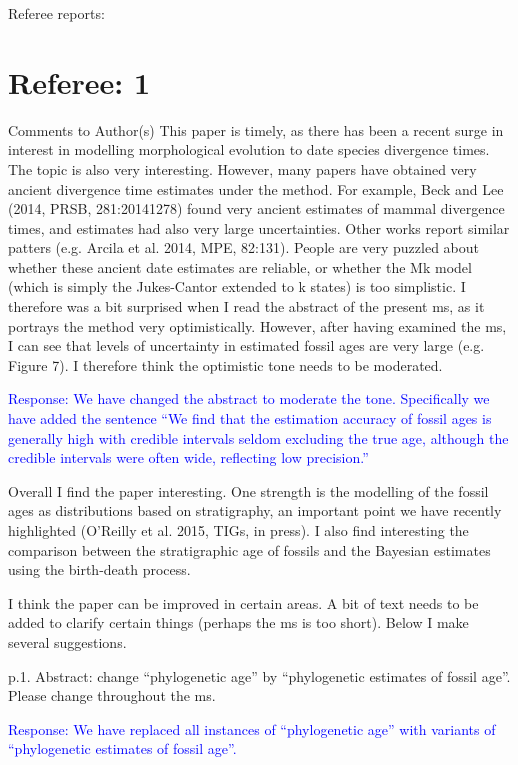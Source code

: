 \documentclass[11pt]{article}
\newcommand{\response}[1]{\medskip{}\textcolor{blue}{{Response: #1}}\medskip{}}
\begin{document}
Referee reports:

\section*{Referee: 1}

Comments to Author(s)
This paper is timely, as there has been a recent surge in interest in modelling morphological evolution to date species divergence times. The topic is also very interesting. However, many papers have obtained very ancient divergence time estimates under the method. For example, Beck and Lee (2014, PRSB, 281:20141278) found very ancient estimates of mammal divergence times, and estimates had also very large uncertainties. Other works report similar patters (e.g. Arcila et al. 2014, MPE, 82:131). People are very puzzled about whether these ancient date estimates are reliable, or whether the Mk model (which is simply the Jukes-Cantor extended to k states) is too simplistic. I therefore was a bit surprised when I read the abstract of the present ms, as it portrays the method very optimistically. However, after having examined the ms, I can see that levels of uncertainty in estimated fossil ages are very large (e.g. Figure 7). I therefore think the optimistic tone needs to be moderated.

\response{We have changed the abstract to moderate the tone. Specifically we have added the sentence ``We find that the estimation accuracy of fossil ages is generally high with credible intervals seldom excluding the true age, although the credible intervals were often wide, reflecting low precision.''}

Overall I find the paper interesting. One strength is the modelling of the fossil ages as distributions based on stratigraphy, an important point we have recently highlighted (O'Reilly et al. 2015, TIGs, in press). I also find interesting the comparison between the stratigraphic age of fossils and the Bayesian estimates using the birth-death process.

I think the paper can be improved in certain areas. A bit of text needs to be added to clarify certain things (perhaps the ms is too short). Below I make several suggestions.

p.1. Abstract: change ``phylogenetic age'' by ``phylogenetic estimates of fossil age''. Please change throughout the ms.

\response{We have replaced all instances of ``phylogenetic age'' with variants of ``phylogenetic estimates of fossil age''.}
\end{document}
